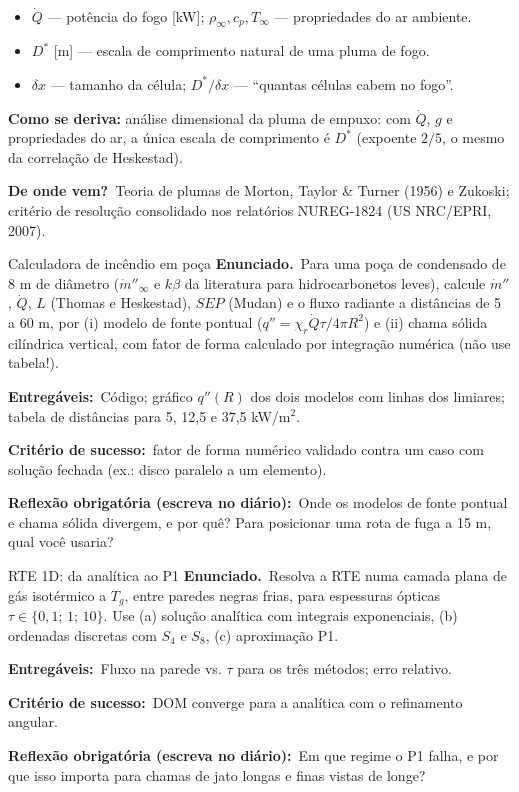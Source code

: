 \documentclass[10pt,a4paper,twocolumn,openany]{report}
\newcommand{\lead}[2]{\par\medskip\noindent{\color{#1}\bfseries #2}\ }
\newenvironment{dicionario}[1][Dicionário da equação]{\lead{azul}{#1.}\small}{\par\medskip}
\newcommand{\origem}{\par\smallskip\noindent\textcolor{azul}{\textbf{De onde vem?}}\ }
\newcommand{\enunciado}{\noindent\textbf{Enunciado.}\ }
\newcommand{\entregaveis}{\par\medskip\noindent\textbf{Entregáveis:}}
\newcommand{\criterio}{\par\medskip\noindent\textbf{Critério de sucesso:}\ }
\newcommand{\reflexao}{\par\medskip\noindent\textbf{Reflexão obrigatória (escreva no diário):}}
\begin{document}
\begin{dicionario}[Dicionário da equação: $D^*$]
\begin{itemize}[leftmargin=*,nosep]
  \item $\dot Q$ --- potência do fogo [kW]; $\rho_\infty,c_p,T_\infty$ ---
        propriedades do ar ambiente.
  \item $D^*$ [m] --- escala de comprimento natural de uma pluma de fogo.
  \item $\delta x$ --- tamanho da célula; $D^*/\delta x$ --- ``quantas
        células cabem no fogo''.
\end{itemize}
\textbf{Como se deriva:} análise dimensional da pluma de empuxo: com $\dot Q$,
$g$ e propriedades do ar, a única escala de comprimento é $D^*$ (expoente
$2/5$, o mesmo da correlação de Heskestad).
\origem Teoria de plumas de Morton, Taylor \& Turner (1956) e Zukoski;
critério de resolução consolidado nos relatórios NUREG-1824 (US NRC/EPRI, 2007).
\end{dicionario}


\begin{tarefa}{Calculadora de incêndio em poça}
\enunciado Para uma poça de condensado de 8 m de diâmetro ($\dot m''_\infty$
e $k\beta$ da literatura para hidrocarbonetos leves), calcule $\dot m''$,
$\dot Q$, $L$ (Thomas e Heskestad), $SEP$ (Mudan) e o fluxo radiante a
distâncias de 5 a 60 m, por (i) modelo de fonte pontual
($q''=\chi_r\dot Q\tau/4\pi R^2$) e (ii) chama sólida cilíndrica vertical,
com fator de forma calculado por integração numérica (não use tabela!).
\entregaveis\ Código; gráfico $q''(R)$ dos dois modelos com linhas dos
limiares; tabela de distâncias para 5, 12,5 e 37,5 kW/m$^2$.
\criterio fator de forma numérico validado contra um caso com solução
fechada (ex.: disco paralelo a um elemento).
\reflexao\ Onde os modelos de fonte pontual e chama sólida divergem, e por
quê? Para posicionar uma rota de fuga a 15 m, qual você usaria?
\end{tarefa}

\begin{tarefa}{RTE 1D: da analítica ao P1}
\enunciado Resolva a RTE numa camada plana de gás isotérmico a $T_g$, entre
paredes negras frias, para espessuras ópticas $\tau\in\{0{,}1;\,1;\,10\}$.
Use (a) solução analítica com integrais exponenciais, (b) ordenadas discretas
com $S_4$ e $S_8$, (c) aproximação P1.
\entregaveis\ Fluxo na parede vs. $\tau$ para os três métodos; erro relativo.
\criterio DOM converge para a analítica com o refinamento angular.
\reflexao\ Em que regime o P1 falha, e por que isso importa para chamas de
jato longas e finas vistas de longe?
\end{tarefa}
\end{document}
